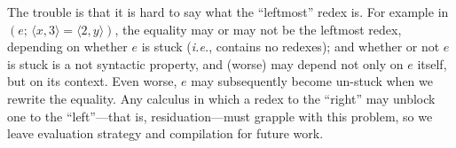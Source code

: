 \documentclass[acmsmall,review,dvipsnames]{acmart}
\newcommand{\Varid}[1]{\mathit{#1}}
\newcommand{\ie}{\emph{i.e.}}	%
\newcommand{\movesto}{\longrightarrow}
\begin{document}
The trouble is that it is hard to say what the ``leftmost'' redex is.  For example in \ensuremath{(\Varid{e};\,\langle{}\Varid{x},\mathrm{3}\rangle\mathrel{=}\langle{}\mathrm{2},\Varid{y}\rangle)},
the equality may or may not be the leftmost redex, depending on whether \ensuremath{\Varid{e}} is stuck ({\ie}, contains no
redexes); and whether or not \ensuremath{\Varid{e}} is stuck is a not syntactic property, and
(worse) may depend not only on \ensuremath{\Varid{e}} itself, but on its context. Even worse, \ensuremath{\Varid{e}} may subsequently
become un-stuck when we rewrite the equality.
Any calculus in which a redex to the ``right'' may unblock one to the
``left''---that is, residuation---must grapple with this problem,
so we leave evaluation strategy and compilation for future work.

\newcommand{\circlednum}[1]{\raisebox{.5pt}{\textcircled{\raisebox{-.9pt} {#1}}}}
\newcommand{\xmovesto}{\hspace{-2mm}\movesto\hspace{-2mm}}
\end{document}

